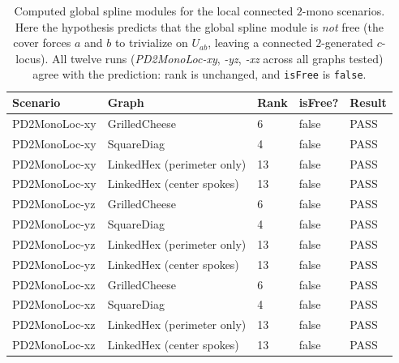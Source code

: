 \documentclass{article}
\begin{document}
\begin{table}[ht]
\centering
\label{tab:pd2monoloc-results}
\begin{tabular}{lllll}
\toprule
Scenario & Graph & Rank & isFree? & Result \\
\midrule
PD2MonoLoc-xy & GrilledCheese                & 6  & false & PASS \\
PD2MonoLoc-xy & SquareDiag                   & 4  & false & PASS \\
PD2MonoLoc-xy & LinkedHex (perimeter only)   & 13 & false & PASS \\
PD2MonoLoc-xy & LinkedHex (center spokes)    & 13 & false & PASS \\
\midrule
PD2MonoLoc-yz & GrilledCheese                & 6  & false & PASS \\
PD2MonoLoc-yz & SquareDiag                   & 4  & false & PASS \\
PD2MonoLoc-yz & LinkedHex (perimeter only)   & 13 & false & PASS \\
PD2MonoLoc-yz & LinkedHex (center spokes)    & 13 & false & PASS \\
\midrule
PD2MonoLoc-xz & GrilledCheese                & 6  & false & PASS \\
PD2MonoLoc-xz & SquareDiag                   & 4  & false & PASS \\
PD2MonoLoc-xz & LinkedHex (perimeter only)   & 13 & false & PASS \\
PD2MonoLoc-xz & LinkedHex (center spokes)    & 13 & false & PASS \\
\bottomrule
\end{tabular}
\caption{Computed global spline modules for the local connected \(2\)-mono scenarios.
Here the hypothesis predicts that the global spline module is \emph{not} free (the cover forces \(a\) and \(b\) to trivialize on \(U_{ab}\), leaving a connected \(2\)-generated \(c\)-locus). All twelve runs (\textit{PD2MonoLoc-xy}, \textit{-yz}, \textit{-xz} across all graphs tested) agree with the prediction: rank is unchanged, and \texttt{isFree} is \texttt{false}.}
\end{table}
\end{document}
